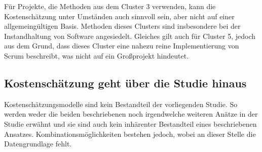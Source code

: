 Für Projekte, die Methoden aus dem Cluster 3 verwenden, kann die Kostenschätzung unter Umständen auch sinnvoll sein, aber nicht auf einer allgemeingültigen Basis. Methoden dieses Clusters sind insbesondere bei der Instandhaltung von Software angesiedelt. Gleiches gilt auch für Cluster 5, jedoch aus dem Grund, dass dieses Cluster eine nahezu reine Implementierung von Scrum beschreibt, was nicht auf ein Großprojekt hindeutet.

\subsection{Kostenschätzung geht über die Studie hinaus}
Kostenschätzungsmodelle sind kein Bestandteil der vorliegenden Studie. So werden weder die beiden beschriebenen noch irgendwelche weiteren Anätze in der Studie erwähnt und sie sind auch kein inhärenter Bestandteil eines beschriebenen Ansatzes. Kombinationsmöglichkeiten bestehen jedoch, wobei an dieser Stelle die Datengrundlage fehlt.